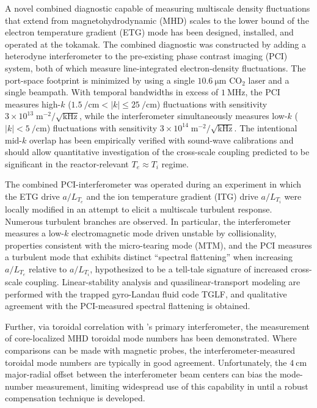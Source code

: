 %
%
%

A novel combined diagnostic capable of measuring multiscale
density fluctuations that extend from
magnetohydrodynamic (MHD) scales to
the lower bound of the electron temperature gradient (ETG) mode
has been designed, installed, and operated at the \diiid\space tokamak.
The combined diagnostic was constructed by adding a heterodyne interferometer
to the pre-existing phase contrast imaging (PCI) system,
both of which measure line-integrated electron-density fluctuations.
The port-space footprint is minimized by using
a single $\SI{10.6}{\micro\meter}$ CO$_2$ laser and
a single beampath.
With temporal bandwidths in excess of $\SI{1}{\mega\hertz}$,
the PCI measures high-$k$
($\SI{1.5}{\per\centi\meter} < |k| \leq \SI{25}{\per\centi\meter}$)
fluctuations with
sensitivity $3 \times 10^{13} \; \text{m}^{-2} / \sqrt{\text{kHz}}$, while
the interferometer simultaneously measures low-$k$
($|k| < \SI{5}{\per\centi\meter}$) fluctuations with
sensitivity $3 \times 10^{14} \; \text{m}^{-2} / \sqrt{\text{kHz}}$.
The intentional mid-$k$ overlap
has been empirically verified with sound-wave calibrations and
should allow quantitative investigation of the cross-scale coupling
predicted to be significant in the reactor-relevant $T_e \approx T_i$ regime.

The combined PCI-interferometer was operated during an experiment
in which the ETG drive $a / L_{T_e}$ and
the ion temperature gradient (ITG) drive $a / L_{T_i}$
were locally modified in an attempt to elicit
a multiscale turbulent response.
Numerous turbulent branches are observed.
In particular, the interferometer measures
a low-$k$ electromagnetic mode driven unstable by collisionality,
properties consistent with the micro-tearing mode (MTM), and
the PCI measures a turbulent mode
that exhibits distinct ``spectral flattening''
when increasing $a / L_{T_e}$ relative to $a / L_{T_i}$,
hypothesized to be a tell-tale signature
of increased cross-scale coupling.
Linear-stability analysis and quasilinear-transport modeling
are performed with the trapped gyro-Landau fluid code TGLF, and
qualitative agreement with the PCI-measured spectral flattening
is obtained.

Further, via toroidal correlation with \diiid's primary interferometer,
the measurement of core-localized MHD toroidal mode numbers
has been demonstrated.
Where comparisons can be made with magnetic probes,
the interferometer-measured toroidal mode numbers
are typically in good agreement.
Unfortunately, the $\SI{4}{\centi\meter}$ major-radial offset
between the interferometer beam centers
can bias the mode-number measurement,
limiting widespread use of this capability in \diiid\space
until a robust compensation technique is developed.
